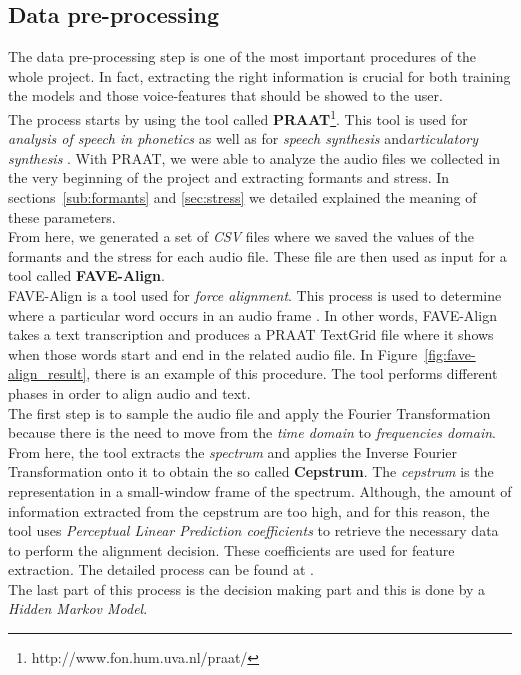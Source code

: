 \subsection{Data pre-processing}
\label{ssec:pre_processing}

The data pre-processing step is one of the most important procedures of the whole project. In fact, extracting the right information is crucial for both training the models and those voice-features that should be showed to the user. \\

\noindent The process starts by using the tool called \textbf{PRAAT}\footnote{http://www.fon.hum.uva.nl/praat/}. This tool is used for \textit{analysis of speech in phonetics} as well as for \textit{speech synthesis} and\textit{articulatory synthesis} \cite{boersma2001praat}. With PRAAT, we were able to analyze the audio files we collected in the very beginning of the project and extracting formants and stress. In sections~\ref{sub:formants} and \ref{sec:stress} we detailed explained the meaning of these parameters. \\
From here, we generated a set of \textit{CSV} files where we saved the values of the formants and the stress for each audio file. These file are then used as input for a tool called \textbf{FAVE-Align}\cite{yuan2008speaker}. \\

\noindent FAVE-Align is a tool used for \textit{force alignment}. This process is used to determine where a particular word occurs in an audio frame \cite{forced_alignment_def}. In other words, FAVE-Align takes a text transcription and produces a PRAAT TextGrid file where it shows when those words start and end in the related audio file. In Figure~\ref{fig:fave-align_result}, there is an example of this procedure. The tool performs different phases in order to align audio and text.\\

\noindent The first step is to sample the audio file and apply the Fourier Transformation because there is the need to move from the \textit{time domain} to \textit{frequencies domain}. From here, the tool extracts the \textit{spectrum} and applies the Inverse Fourier Transformation onto it to obtain the so called \textbf{Cepstrum}. The \textit{cepstrum} is the representation in a small-window frame of the spectrum. Although, the amount of information extracted from the cepstrum are too high, and for this reason, the tool uses \textit{Perceptual Linear Prediction coefficients} to retrieve the necessary data to perform the alignment decision. These coefficients are used for feature extraction. The detailed process can be found at \cite{hermansky1990perceptual}. \\
The last part of this process is the decision making part and this is done by a \textit{Hidden Markov Model}. \\

